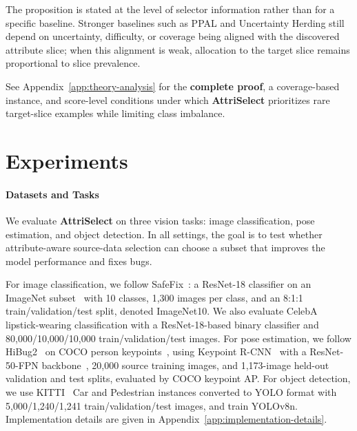 \documentclass{article}
\newcommand{\modelname}{AttriSelect}
\newcommand{\model}{\textcolor{darkteal}{\textbf{\modelname}}\xspace}
\newcommand{\safefix}{SafeFix\xspace}
\begin{document}
The proposition is stated at the level of selector information rather than for a specific baseline. Stronger baselines such as PPAL and Uncertainty Herding still depend on uncertainty, difficulty, or coverage being aligned with the discovered attribute slice; when this alignment is weak, allocation to the target slice remains proportional to slice prevalence.

\begin{tcolorbox}[
    colback=gray!3!white, 
    colframe=gray!15!white, 
    arc=2pt, 
    boxrule=0.5pt, 
    top=4pt, bottom=4pt, left=6pt, right=6pt
]
\small\noindent See Appendix~\ref{app:theory-analysis} for the \textbf{complete proof}, a coverage-based instance, and score-level conditions under which \model prioritizes rare target-slice examples while limiting class imbalance.
\end{tcolorbox}

\section{Experiments}

\paragraph{Datasets and Tasks}
We evaluate \model on three vision tasks: image classification, pose estimation, and object detection. In all settings, the goal is to test whether attribute-aware source-data selection can choose a subset that improves the model performance and fixes bugs.

For image classification, we follow \safefix~\citep{xu2025safefix}: a ResNet-18 classifier on an ImageNet subset~\citep{deng2009imagenet} with 10 classes, 1,300 images per class, and an 8:1:1 train/validation/test split, denoted ImageNet10. We also evaluate CelebA~\citep{liu2015deep} lipstick-wearing classification with a ResNet-18-based binary classifier and 80,000/10,000/10,000 train/validation/test images. For pose estimation, we follow HiBug2~\citep{chen2025hibug2} on COCO person keypoints~\citep{lin2014microsoft}, using Keypoint R-CNN~\citep{mask-rcnn-2017} with a ResNet-50-FPN backbone~\citep{he2016deep}, 20,000 source training images, and 1,173-image held-out validation and test splits, evaluated by COCO keypoint AP. For object detection, we use KITTI~\citep{geiger2012we} Car and Pedestrian instances converted to YOLO format with 5,000/1,240/1,241 train/validation/test images, and train YOLOv8n. Implementation details are given in Appendix~\ref{app:implementation-details}.
\end{document}
